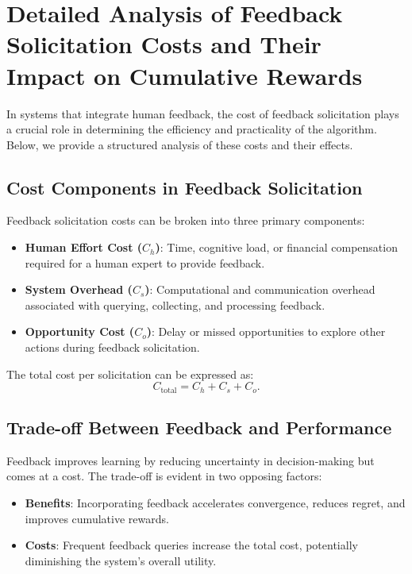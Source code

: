 
\section{Detailed Analysis of Feedback Solicitation Costs and Their Impact on Cumulative Rewards}

In systems that integrate human feedback, the cost of feedback solicitation plays a crucial role in determining the efficiency and practicality of the algorithm. Below, we provide a structured analysis of these costs and their effects.

\subsection{Cost Components in Feedback Solicitation}

Feedback solicitation costs can be broken into three primary components:
\begin{itemize}
    \item \textbf{Human Effort Cost (\(C_h\))}: Time, cognitive load, or financial compensation required for a human expert to provide feedback.
    \item \textbf{System Overhead (\(C_s\))}: Computational and communication overhead associated with querying, collecting, and processing feedback.
    \item \textbf{Opportunity Cost (\(C_o\))}: Delay or missed opportunities to explore other actions during feedback solicitation.
\end{itemize}

The total cost per solicitation can be expressed as:
\[
C_{\text{total}} = C_h + C_s + C_o.
\]

\subsection{Trade-off Between Feedback and Performance}

Feedback improves learning by reducing uncertainty in decision-making but comes at a cost. The trade-off is evident in two opposing factors:
\begin{itemize}
    \item \textbf{Benefits}: Incorporating feedback accelerates convergence, reduces regret, and improves cumulative rewards.
    \item \textbf{Costs}: Frequent feedback queries increase the total cost, potentially diminishing the system’s overall utility.
\end{itemize}

